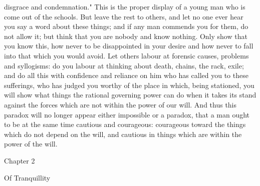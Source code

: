 \documentclass[a4paper]{article}
\begin{document}
disgrace and condemnation." This is the proper display of a young man who is
come out of the schools. But leave the rest to others, and let no one ever hear
you say a word about these things; and if any man commends you for them, do not
allow it; but think that you are nobody and know nothing. Only show that you
know this, how never to be disappointed in your desire and how never to fall
into that which you would avoid. Let others labour at forensic causes, problems
and syllogisms: do you labour at thinking about death, chains, the rack, exile;
and do all this with confidence and reliance on him who has called you to these
sufferings, who has judged you worthy of the place in which, being stationed,
you will show what things the rational governing power can do when it takes its
stand against the forces which are not within the power of our will. And thus
this paradox will no longer appear either impossible or a paradox, that a man
ought to be at the same time cautious and courageous: courageous toward the
things which do not depend on the will, and cautious in things which are within
the power of the will.

Chapter 2

Of Tranquillity
\end{document}
